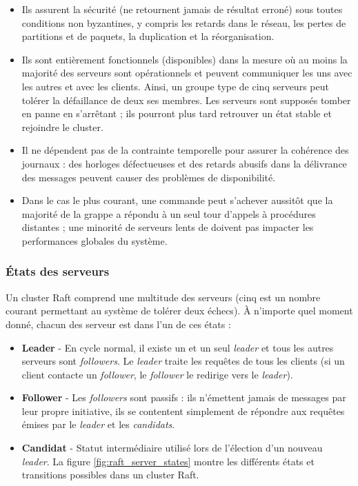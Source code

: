 \begin{itemize}
    \item Ils assurent la sécurité (ne retournent jamais de résultat erroné)
        sous toutes conditions non byzantines, y compris les retards dans le
        réseau, les pertes de partitions et de paquets, la duplication et
        la réorganisation.
    \item Ils sont entièrement fonctionnels (disponibles) dans la mesure où au
        moins la majorité des serveurs sont opérationnels et peuvent communiquer
        les uns avec les autres et avec les clients. Ainsi, un groupe type de
        cinq serveurs peut tolérer la défaillance de deux ses membres. Les
        serveurs sont supposés tomber en panne en s'arrêtant ; ils pourront plus
        tard retrouver un état stable et rejoindre le cluster.
    \item Il ne dépendent pas de la contrainte temporelle pour assurer la
        cohérence des journaux : des horloges défectueuses et des retards
        abusifs dans la délivrance des messages peuvent causer des problèmes de
        disponibilité. 
    \item Dans le cas le plus courant, une commande peut s'achever aussitôt que
        la majorité de la grappe a répondu à un seul tour d'appels à procédures
        distantes ; une minorité de serveurs lents de doivent pas impacter les
        performances globales du système.
\end{itemize}

\subsubsection{États des serveurs}

Un cluster Raft comprend une multitude des serveurs (cinq est un nombre courant
permettant au système de tolérer deux échecs). À n'importe quel moment donné,
chacun des serveur est dans l'un de ces états :

\begin{itemize}
    \item \textbf{Leader} -
        En cycle normal, il existe un et un seul \emph{leader} et tous les autres
        serveurs sont \emph{followers}. Le \emph{leader} traite les requêtes de
        tous les clients (si un client contacte un \emph{follower}, le
        \emph{follower} le redirige vers le \emph{leader}).
    \item \textbf{Follower} -
        Les \emph{followers} sont passifs : ils n'émettent jamais de messages par
        leur propre initiative, ils se contentent simplement de répondre aux
        requêtes émises par le \emph{leader} et les \emph{candidats}.
    \item \textbf{Candidat} -
        Statut intermédiaire utilisé lors de l'élection d'un nouveau
        \emph{leader}. La figure \ref{fig:raft_server_states} montre les différents états
        et transitions possibles dans un cluster Raft.
\end{itemize}

